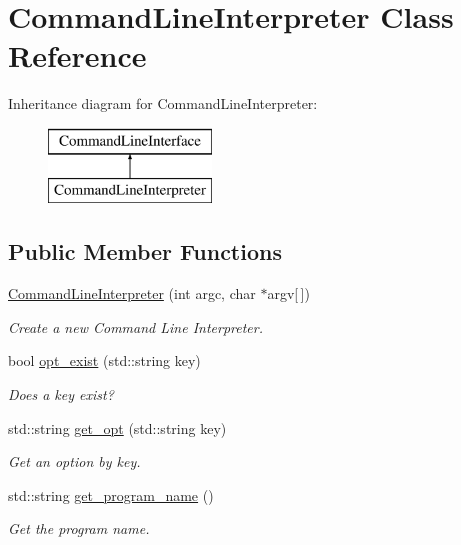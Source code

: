 \hypertarget{classCommandLineInterpreter}{\section{Command\-Line\-Interpreter Class Reference}
\label{classCommandLineInterpreter}
}
Inheritance diagram for Command\-Line\-Interpreter\-:\begin{figure}[H]
\begin{center}
\leavevmode
\includegraphics[height=2.000000cm]{classCommandLineInterpreter}
\end{center}
\end{figure}
\subsection*{Public Member Functions}
\begin{DoxyCompactItemize}
\item 
\hyperlink{classCommandLineInterpreter_a01f8bc835f57c535fd20b75d83825067}{Command\-Line\-Interpreter} (int argc, char $\ast$argv\mbox{[}$\,$\mbox{]})
\begin{DoxyCompactList}\small\item\em Create a new Command Line Interpreter. \end{DoxyCompactList}\item 
\hypertarget{classCommandLineInterpreter_ac47f18ba85e0a282c1e4e073aa9681e6}{bool \hyperlink{classCommandLineInterpreter_ac47f18ba85e0a282c1e4e073aa9681e6}{opt\-\_\-exist} (std\-::string key)}\label{classCommandLineInterpreter_ac47f18ba85e0a282c1e4e073aa9681e6}

\begin{DoxyCompactList}\small\item\em Does a key exist? \end{DoxyCompactList}\item 
\hypertarget{classCommandLineInterpreter_a98b3e98a2a9f6bb1df34e7c1ce438738}{std\-::string \hyperlink{classCommandLineInterpreter_a98b3e98a2a9f6bb1df34e7c1ce438738}{get\-\_\-opt} (std\-::string key)}\label{classCommandLineInterpreter_a98b3e98a2a9f6bb1df34e7c1ce438738}

\begin{DoxyCompactList}\small\item\em Get an option by key. \end{DoxyCompactList}\item 
std\-::string \hyperlink{classCommandLineInterpreter_a6d8a4dd860eca967dc27c47d06e92075}{get\-\_\-program\-\_\-name} ()
\begin{DoxyCompactList}\small\item\em Get the program name. \end{DoxyCompactList}\end{DoxyCompactItemize}


